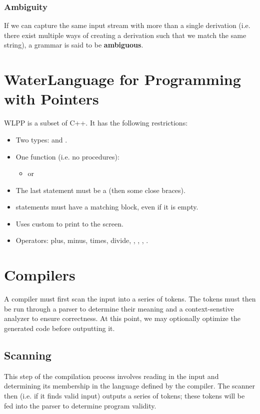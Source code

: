 \documentclass[12pt]{article}
\begin{document}
\subsubsection*{Ambiguity}
If we can capture the same input stream with more than a single derivation (i.e. there exist multiple ways of creating a derivation such that we match the same string), a grammar is said to be {\bf ambiguous}.

\section*{WaterLanguage for Programming with Pointers}
WLPP is a subset of C++. It has the following restrictions:
\begin{itemize}
\item Two types:  and .
\item One function (i.e. no procedures):
\begin{itemize}
\item {} or 
\end{itemize}
\item The last statement must be a  (then some close braces).
\item {} statements must have a matching  block, even if it is empty.
\item Uses custom  to print to the screen.
\item Operators: plus, minus, times, divide, \code{*}, \code{\&}, , .
\end{itemize}

\section*{Compilers}
A compiler must first scan the input into a series of tokens. The tokens must then be run through a parser to determine their meaning and a context-senstive analyzer to ensure correctness. At this point, we may optionally optimize the generated code before outputting it.

\subsection*{Scanning}
This step of the compilation process involves reading in the input and determining its membership in the language defined by the compiler. The scanner then (i.e. if it finds valid input) outputs a series of tokens; these tokens will be fed into the parser to determine program validity.
\end{document}
